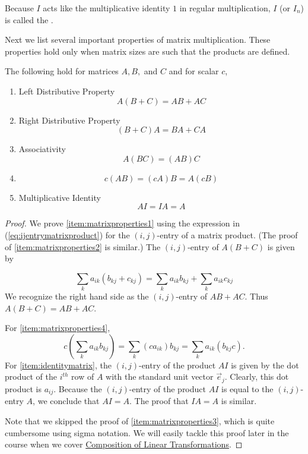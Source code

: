 \documentclass{ximera}
\begin{document}
Because $I$ acts like the multiplicative identity $1$ in regular multiplication, $I$ (or $I_n$) is called the .

Next we list several important properties of matrix multiplication. These properties hold only when matrix sizes are such that the products are defined. 

\begin{theorem}\label{th:propertiesofmatrixmultiplication}
The following hold for matrices $A,B,$ and $C$ and for scalar $c$,
\begin{enumerate}
\item \label{item:matrixproperties1} Left Distributive Property
$$A\left( B+C\right) =AB +AC$$
\item\label{item:matrixproperties2} Right Distributive Property
$$\left( B+C\right) A=BA+CA$$
\item \label{item:matrixproperties3} Associativity
$$A\left( BC\right) =\left( AB\right) C$$
\item\label{item:matrixproperties4}
$$c(AB)=(cA)B=A(cB)$$
\item \label{item:identitymatrix} Multiplicative Identity
$$AI=IA=A$$
\end{enumerate}
\end{theorem}

\begin{proof}
We prove \ref{item:matrixproperties1} using the expression in (\ref{eq:ijentrymatrixproduct}) for the $(i,j)$-entry of a matrix product. (The proof of \ref{item:matrixproperties2} is similar.) The $(i,j)$-entry of $A(B+C)$ is given by

$$
\sum_{k}a_{ik}( b_{kj}+c_{kj})=\sum_{k}a_{ik}b_{kj}+\sum_{k}a_{ik}c_{kj}
$$
We recognize the right hand side as the $(i,j)$-entry of $AB+AC$.
Thus $A(B+C) =AB+AC$.

For \ref{item:matrixproperties4},
$$c\left(\sum_{k}a_{ik}b_{kj}\right) = \sum_{k}\left(c a_{ik}\right)b_{kj} = \sum_{k}a_{ik} \left(b_{kj} c\right).$$
For \ref{item:identitymatrix}, the $(i,j)$-entry of the product $AI$ is given by the dot product of the $i^{th}$ row of $A$ with the standard unit vector $\vec{e}_j$.  Clearly, this dot product is $a_{ij}$.  Because the $(i,j)$-entry of the product $AI$ is equal to the $(i,j)$-entry $A$, we conclude that $AI=A$.  The proof that $IA=A$ is similar.

Note that we skipped the proof of \ref{item:matrixproperties3}, which is quite cumbersome using sigma notation.  We will easily tackle this proof later in the course when we cover \href{https://ximera.osu.edu/linearalgebradzv3/LinearAlgebraInteractiveIntro/LTR-0030/main}{Composition of Linear Transformations}.
\end{proof}
\end{document}
